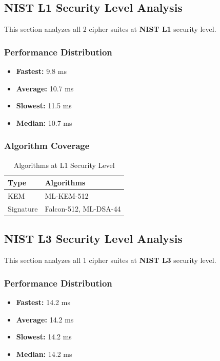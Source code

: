 \documentclass[11pt,a4paper,twoside]{article}
\begin{document}
\subsection{NIST L1 Security Level Analysis}
\label{sec:level-l1}

This section analyzes all 2 cipher suites at \textbf{NIST L1} security level.

\subsubsection{Performance Distribution}

\begin{itemize}
    \item \textbf{Fastest:} 9.8 ms
    \item \textbf{Average:} 10.7 ms
    \item \textbf{Slowest:} 11.5 ms
    \item \textbf{Median:} 10.7 ms
\end{itemize}

\subsubsection{Algorithm Coverage}

\begin{table}[H]
\centering
\caption{Algorithms at L1 Security Level}
\begin{tabular}{l l}
\toprule
\textbf{Type} & \textbf{Algorithms} \\
\midrule
KEM & ML-KEM-512 \\
Signature & Falcon-512, ML-DSA-44 \\
\bottomrule
\end{tabular}
\end{table}

\subsection{NIST L3 Security Level Analysis}
\label{sec:level-l3}

This section analyzes all 1 cipher suites at \textbf{NIST L3} security level.

\subsubsection{Performance Distribution}

\begin{itemize}
    \item \textbf{Fastest:} 14.2 ms
    \item \textbf{Average:} 14.2 ms
    \item \textbf{Slowest:} 14.2 ms
    \item \textbf{Median:} 14.2 ms
\end{itemize}
\end{document}
